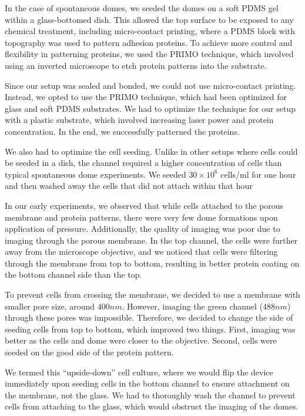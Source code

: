 In the case of spontaneous domes, we seeded the domes on a soft PDMS gel
within a glass-bottomed dish. This allowed the top surface to be exposed
to any chemical treatment, including micro-contact printing, where a
PDMS block with topography was used to pattern adhesion proteins. To
achieve more control and flexibility in patterning proteins, we used the
PRIMO technique, which involved using an inverted microscope to etch
protein patterns into the substrate.

Since our setup was sealed and bonded, we could not use micro-contact
printing. Instead, we opted to use the PRIMO technique, which had been
optimized for glass and soft PDMS substrates. We had to optimize the
technique for our setup with a plastic substrate, which involved
increasing laser power and protein concentration. In the end, we
successfully patterned the proteins.

We also had to optimize the cell seeding. Unlike in other setups where
cells could be seeded in a dish, the channel required a higher
concentration of cells than typical spontaneous dome experiments. We
seeded \(30\times 10^6\) cells/ml for one hour and then washed away the
cells that did not attach within that hour

In our early experiments, we observed that while cells attached to the
porous membrane and protein patterns, there were very few dome
formations upon application of pressure. Additionally, the quality of
imaging was poor due to imaging through the porous membrane. In the top
channel, the cells were further away from the microscope objective, and
we noticed that cells were filtering through the membrane from top to
bottom, resulting in better protein coating on the bottom channel side
than the top.

To prevent cells from crossing the membrane, we decided to use a
membrane with smaller pore size, around \(400nm\). However, imaging the
green channel (\(488nm\)) through these pores was impossible. Therefore,
we decided to change the side of seeding cells from top to bottom, which
improved two things. First, imaging was better as the cells and dome
were closer to the objective. Second, cells were seeded on the good side
of the protein pattern.

We termed this ``upside-down'' cell culture, where we would flip the
device immediately upon seeding cells in the bottom channel to ensure
attachment on the membrane, not the glass. We had to thoroughly wash the
channel to prevent cells from attaching to the glass, which would
obstruct the imaging of the domes.

